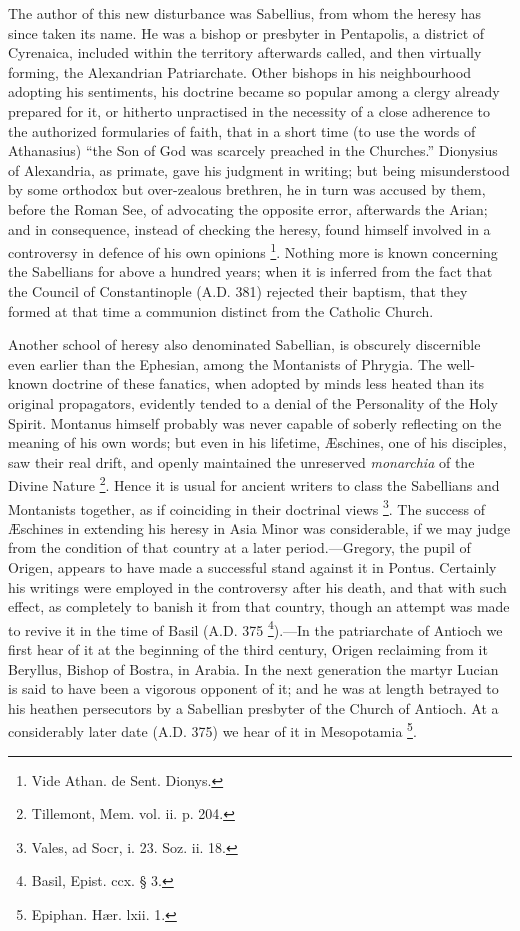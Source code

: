 The author of this new disturbance was Sabellius, from whom the
heresy has since taken its name. He was a bishop or presbyter in
Pentapolis, a district of Cyrenaica, included within the territory
afterwards called, and then virtually forming, the Alexandrian
Patriarchate. Other bishops in his neighbourhood adopting his
sentiments, his doctrine became so popular among a clergy already
prepared for it, or hitherto unpractised in the necessity of a close
adherence to the authorized formularies of faith, that in a short time
(to use the words of Athanasius) ``the Son of God was scarcely
preached in the Churches.'' Dionysius of Alexandria, as primate,
gave his judgment in writing; but being misunderstood by some orthodox
but over-zealous brethren, he in turn was accused by them, before the
Roman See, of advocating the opposite error, afterwards the Arian; and
in consequence, instead of checking the heresy, found himself involved
in a controversy in defence of his own opinions \footnote{Vide Athan. de Sent. Dionys.}. Nothing more is known concerning the Sabellians for above a
hundred years; when it is inferred from the fact that the Council of
Constantinople (A.D. 381) rejected their
baptism, that they formed at that time a communion distinct from the
Catholic Church.

Another school of heresy also denominated Sabellian, is obscurely
discernible even earlier than the Ephesian, among the Montanists of
Phrygia. The well-known doctrine of these fanatics, when adopted by minds less heated than its original propagators, evidently tended
to a denial of the Personality of the Holy Spirit. Montanus himself
probably was never capable of soberly reflecting on the meaning of his
own words; but even in his lifetime, Æschines, one of his disciples,
saw their real drift, and openly maintained the unreserved \emph{monarchia}
of the Divine Nature \footnote{Tillemont, Mem. vol. ii. p. 204.}.
Hence it is usual for ancient writers to class the Sabellians and
Montanists together, as if coinciding in their doctrinal views \footnote{Vales, ad Socr, i. 23. Soz. ii. 18.}. The success of Æschines in extending his heresy in Asia Minor
was considerable, if we may judge from the condition of that country
at a later period.—Gregory, the pupil of Origen, appears to have
made a successful stand against it in Pontus. Certainly his writings
were employed in the controversy after his death, and that with such
effect, as completely to banish it from that country, though an
attempt was made to revive it in the time of Basil (A.D.
375 \footnote{Basil, Epist. ccx. § 3.}).—In the
patriarchate of Antioch we first hear of it at the beginning of the
third century, Origen reclaiming from it Beryllus, Bishop of Bostra,
in Arabia. In the next generation the martyr Lucian is said to have
been a vigorous opponent of it; and he was at length betrayed to his
heathen persecutors by a Sabellian presbyter of the Church of Antioch.
At a considerably later date (A.D. 375) we hear
of it in Mesopotamia \footnote{Epiphan. Hær. lxii. 1.}.


